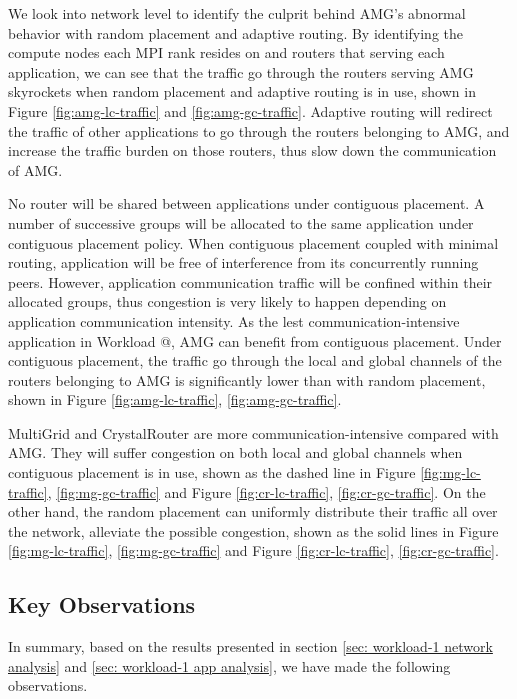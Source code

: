 \documentclass[conference,compsoc]{IEEEtran}
\makeatletter
\newcommand{\Rmnum}[1]{\expandafter\@slowromancap\romannumeral #1@}
\makeatother
\begin{document}
We look into network level to identify the culprit behind AMG's abnormal behavior with random placement and adaptive routing. By identifying the compute nodes each MPI rank resides on and routers that serving each application, we can see that the traffic go through the routers serving AMG skyrockets when random placement and adaptive routing is in use, shown in Figure \ref{fig:amg-lc-traffic} and \ref{fig:amg-gc-traffic}. Adaptive routing will redirect the traffic of other applications to go through the routers belonging to AMG, and increase the traffic burden on those routers, thus slow down the communication of AMG.

No router will be shared between applications under contiguous placement. A number of successive groups will be allocated to the same application under contiguous placement policy. When contiguous placement coupled with minimal routing, application will be free of interference from its concurrently running peers. However, application communication traffic will be confined within their allocated groups, thus congestion is very likely to happen depending on application communication intensity. As the lest communication-intensive application in Workload \Rmnum{1}, AMG can benefit from contiguous placement. Under contiguous placement, the traffic go through the local and global channels of the routers belonging to AMG is significantly lower than with random placement, shown in Figure \ref{fig:amg-lc-traffic}, \ref{fig:amg-gc-traffic}. 

MultiGrid and CrystalRouter are more communication-intensive compared with AMG. They will suffer congestion on both local and global channels when contiguous placement is in use, shown as the dashed line in Figure \ref{fig:mg-lc-traffic}, \ref{fig:mg-gc-traffic} and Figure \ref{fig:cr-lc-traffic}, \ref{fig:cr-gc-traffic}. On the other hand, the random placement can uniformly distribute their traffic all over the network, alleviate the possible congestion, shown as the solid lines in Figure \ref{fig:mg-lc-traffic}, \ref{fig:mg-gc-traffic} and Figure \ref{fig:cr-lc-traffic}, \ref{fig:cr-gc-traffic}.



\subsection{Key Observations}
In summary, based on the results presented in section \ref{sec: workload-1 network analysis} and \ref{sec: workload-1 app analysis}, we have made the following observations.
\end{document}
